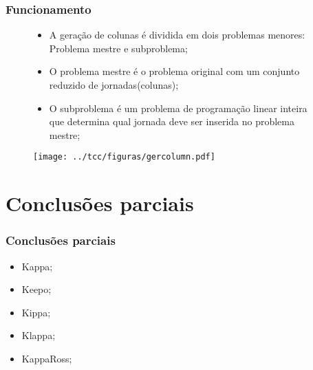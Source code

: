 \documentclass{beamer}
\begin{document}
\begin{frame}
    \frametitle{Funcionamento}

    \begin{figure}[!htb]
        \centering
        \begin{minipage}{0.55\textwidth}
            \begin{itemize}
                \item A geração de colunas é dividida em dois problemas menores: Problema mestre e subproblema;
                \item O problema mestre é o problema original com um conjunto reduzido de jornadas(colunas);
                \item O subproblema é um problema de programação linear inteira que determina qual jornada
                    deve ser inserida no problema mestre;
            \end{itemize}
        \end{minipage}
%
        \begin{minipage}{.40\textwidth}
{
    \centering
    \texttt{[image: ../tcc/figuras/gercolumn.pdf]}
    \label{treta}
}
        \end{minipage}
    \end{figure}

\end{frame}

\section{Conclusões parciais}
\begin{frame}
    \frametitle{Conclusões parciais}
    \begin{itemize}
        \item Kappa;
        \item Keepo;
        \item Kippa;
        \item Klappa;
        \item KappaRoss;
    \end{itemize}
\end{frame}


\begin{frame}
    \printbibliography
\end{frame}
\end{document}
